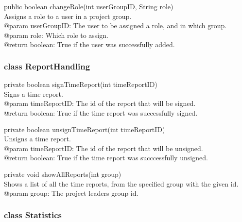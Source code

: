 \documentclass[a4paper]{article}
\begin{document}
\vspace{5mm}
\begin{hangparas}{1.5em}{1}
public boolean changeRole(int userGroupID, String role)\\
Assigns a role to a user in a project group.\\
@param userGroupID: The user to be assigned a role, and in which group.\\
@param role: Which role to assign.\\
@return boolean: True if the user was successfully added.\\
\end{hangparas}

\subsubsection{class ReportHandling}

\begin{hangparas}{1.5em}{1}
private boolean signTimeReport(int timeReportID)\\
Signs a time report.\\
@param timeReportID: The id of the report that will be signed.\\
@return boolean: True if the time report was successfully signed.
\end{hangparas}

\vspace{5mm}
\begin{hangparas}{1.5em}{1}
private boolean unsignTimeReport(int timeReportID)\\
Unsigns a time report.\\
@param timeReportID: The id of the report that will be unsigned.\\
@return boolean: True if the time report was succcessfully unsigned.
\end{hangparas}

\vspace{5mm}
\begin{hangparas}{1.5em}{1}
private void showAllReports(int group)\\
Shows a list of all the time reports, from the specified group with the given id.\\
@param group: The project leaders group id.\\
\end{hangparas}


\subsubsection{class Statistics}
\end{document}
